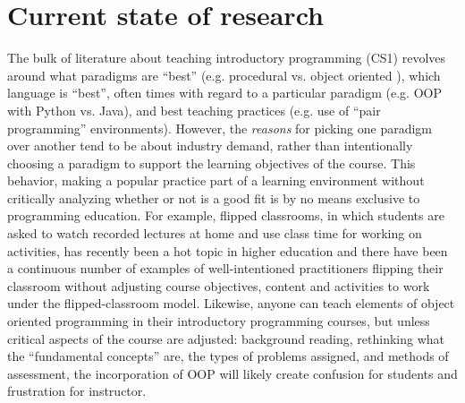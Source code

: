 \documentclass[12pt]{article}
\begin{document}
\section{Current state of research}
The bulk of literature about teaching introductory programming (CS1)
revolves around what paradigms are ``best'' (e.g. procedural
vs. object oriented
\autocite{bailie_objects_2003,moritz_objectsfirst_2005,reges_back_2006}),
which language is ``best'', often times with regard to a particular
paradigm (e.g. OOP with Python
vs. Java\autocite{goldwasser_teaching_2008,koulouri_teaching_2014}),
and best teaching practices (e.g. use of “pair programming”
environments\autocite{williams_support_2001,mcdowell_effects_2002,thomas_code_2003,chong_social_2007,salleh_empirical_2011}). However,
the \emph{reasons} for picking one paradigm over another tend to be
about industry demand, rather than intentionally choosing a paradigm
to support the learning objectives of the course. This behavior,
making a popular practice part of a learning environment without
critically analyzing whether or not is a good fit is by no means
exclusive to programming education. For example, flipped
classrooms\autocite{bishop_flipped_2013}, in which students are asked
to watch recorded lectures at home and use class time for working on
activities, has recently been a hot topic in higher education and
there have been a continuous number of examples of well-intentioned
practitioners flipping their classroom without adjusting course
objectives, content and activities to work under the flipped-classroom
model\autocite{desantis_students_2015}. Likewise, anyone can teach
elements of object oriented programming in their introductory
programming courses, but unless critical aspects of the course are
adjusted: background reading, rethinking what the ``fundamental
concepts'' are, the types of problems assigned, and methods of
assessment, the incorporation of OOP will likely create confusion for
students and frustration for instructor\autocite{kolling_problem_1999}.

\end{document}
